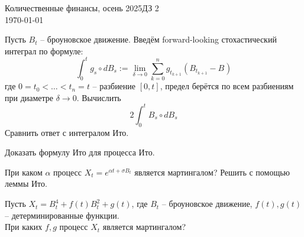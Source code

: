 \documentclass[12pt]{article}
\begin{document}
\noindent Количественные финансы, осень 2025\hfill ДЗ 2\\
\today

\hrulefill

\begin{problem}
    Пусть $B_t$ -- броуновское движение.  Введём forward-looking стохастический интеграл по формуле:
    $$
        \int_0^t g_s \circ dB_s := \lim_{\delta \to 0} \sum_{k=0}^n g_{t_{k+1}} (B_{t_{k+1}} - B_{})
    $$где $0=t_0 < \ldots < t_n = t$ -- разбиение $[0, t]$, предел берётся по всем разбиениям при диаметре $\delta \to 0$. Вычислить
    $$
        2 \int_0^t B_s \circ dB_s
    $$Сравнить ответ с интегралом Ито.
\end{problem}

\begin{problem}
    Доказать формулу Ито для процесса Ито.
\end{problem}

\begin{problem}
    При каком $\alpha$ процесс $X_t = e^{\alpha t + \sigma B_t}$ является мартингалом? Решить с помощью леммы Ито.
\end{problem}
 
\begin{problem}
    Пусть $X_t = B_t^4 + f(t) B_t^2 + g(t)$, где $B_t$ -- броуновское движение, $f(t), g(t)$ -- детерминированные функции. 
    \\ При каких $f, g$ процесс $X_t$ является мартингалом? 
\end{problem}
\end{document}

